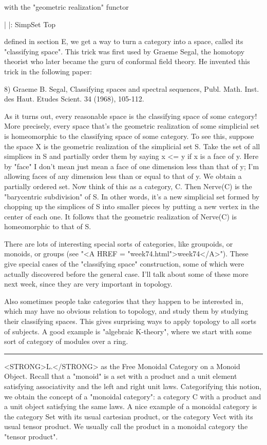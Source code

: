 with the "geometric realization" functor 

                | |: SimpSet \to  Top

defined in section E, we get a way to turn a category into a space, 
called its "classifying space".  This trick was first used by Graeme 
Segal, the homotopy theorist who later became the guru of conformal 
field theory.  He invented this trick in the following paper:

8) Graeme B. Segal, Classifying spaces and spectral sequences,
Publ. Math. Inst. des Haut. Etudes Scient. 34 (1968), 105-112.

As it turns out, every reasonable space is the classifying space of some
category!  More precisely, every space that's the geometric realization
of some simplicial set is homeomorphic to the classifying space of some
category.  To see this, suppose the space X is the geometric realization
of the simplicial set S.  Take the set of all simplices in S and
partially order them by saying x <= y if x is a face of y.  Here by
"face" I don't mean just mean a face of one dimension less than that of
y; I'm allowing faces of any dimension less than or equal to that of y.
We obtain a partially ordered set.  Now think of this as a category, C.
Then Nerve(C) is the "barycentric subdivision" of S.  In other words,
it's a new simplicial set formed by chopping up the simplices of S into
smaller pieces by putting a new vertex in the center of each one.  It
follows that the geometric realization of Nerve(C) is homeomorphic to
that of S.

There are lots of interesting special sorts of categories, like
groupoids, or monoids, or groups (see "<A HREF = "week74.html">week74</A>").  These give special
cases of the "classifying space" construction, some of which were
actually discovered before the general case.  I'll talk about some of
these more next week, since they are very important in topology.  

Also sometimes people take categories that they happen to be interested
in, which may have no obvious relation to topology, and study them by
studying their classifying spaces.  This gives surprising ways to apply
topology to all sorts of subjects.  A good example is "algebraic
K-theory", where we start with some sort of category of modules over a
ring.

\par\noindent\rule{\textwidth}{0.4pt}
<STRONG>L.</STRONG>  \Delta  as the Free Monoidal Category on a Monoid Object.  Recall that
a "monoid" is a set with a product and a unit element satisfying
associativity and the left and right unit laws.  Categorifying this
notion, we obtain the concept of a "monoidal category": a category C
with a product and a unit object satisfying the same laws.  A nice
example of a monoidal category is the category Set with its usual
cartesian product, or the category Vect with its usual tensor product.
We usually call the product in a monoidal category the "tensor product".

